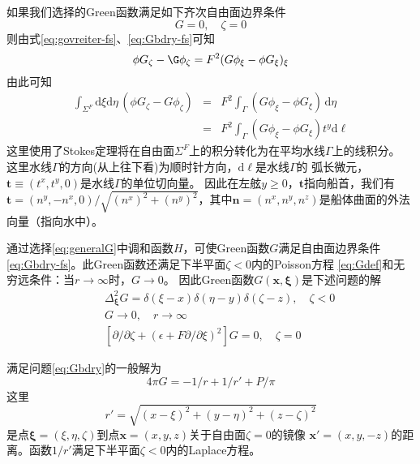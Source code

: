 如果我们选择的Green函数满足如下齐次自由面边界条件
\begin{equation}
  [\partial/\partial\zeta+(\epsilon+F\partial/\partial\xi)^2]G=0, \quad \zeta=0
  \label{eq:Gbdry-fs}
\end{equation}
则由式\eqref{eq:govreiter-fs}、\eqref{eq:Gbdry-fs}可知
\begin{equation}
  \phi G_{\zeta}-\G\phi_{\zeta}=F^2(G\phi_{\xi}-\phi G_{\xi})_{\xi}
  \label{eq:fsintegrand}
\end{equation}
由此可知
\begin{eqnarray}
  \int_{\Sigma^F}\mathrm{d}\xi\mathrm{d}\eta\,
  (\phi G_{\zeta}-G\phi_{\zeta})
  &=&F^2\int_{\Gamma}(G\phi_\xi-\phi G_\xi)\,\mathrm{d}\eta \nonumber\\
  &=&F^2\int_{\Gamma}(G\phi_{\xi}-\phi G_{\xi})t^y\mathrm{d}\ell
  \label{eq:watr}
\end{eqnarray}
这里使用了Stokes定理将在自由面$\Sigma^F$上的积分转化为在平均水线$\Gamma$上的线积分。
这里水线$\Gamma$的方向(从上往下看)为顺时针方向，$\mathrm{d}\ell$是水线$\Gamma$的
弧长微元，$\mathbf{t}\equiv (t^x,t^y,0)$是水线$\Gamma$的单位切向量。
因此在左舷$y\ge0$，$\mathbf{t}$指向船首，我们有$\mathbf{t}=(n^y,-n^x,0)/\sqrt{(n^x)^2+(n^y)^2}$，其中$\mathbf{n}=(n^x,n^y,n^z)$是船体曲面的外法向量（指向水中）。


通过选择\eqref{eq:generalG}中调和函数$H$，可使Green函数$G$满足自由面边界条件
\eqref{eq:Gbdry-fs}。此Green函数还满足下半平面$\zeta<0$内的Poisson方程
\eqref{eq:Gdef}和无穷远条件：当$r\to\infty$时，$G\to0$。
因此Green函数$G(\mathbf{x},\bm{\xi})$是下述问题的解
\begin{subequations}\label{eq:Gbdry}
  \begin{eqnarray}
    &&\Delta^2_{\bm{\xi}}G=\delta(\xi-x)\delta(\eta-y)\delta(\zeta-z),\quad \zeta<0
    \label{eq:Gbdrygov}\\
    &&G\to0,\quad r\to\infty\label{eq:Gbdryfar}\\
    &&[\partial/\partial\zeta+(\epsilon+F\partial/\partial\xi)^2]G=0,\quad \zeta=0
    \label{eq:Gbdryfs}
  \end{eqnarray}
\end{subequations}

满足问题\eqref{eq:Gbdry}的一般解为
\begin{equation}
  4\pi G=-1/r+1/r'+P/\pi
  \label{eq:fsGgeneral}
\end{equation}
这里
\begin{equation}
  r'=\sqrt{(x-\xi)^2+(y-\eta)^2+(z-\zeta)^2}
  \label{eq:r'}
\end{equation}
是点$\bm{\xi}=(\xi,\eta,\zeta)$到点$\mathbf{x}=(x,y,z)$关于自由面$\zeta=0$的镜像
$\mathbf{x'}=(x,y,-z)$的距离。函数$1/r'$满足下半平面$\zeta<0$内的Laplace方程。

